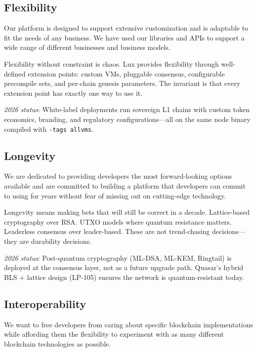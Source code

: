 \documentclass[11pt,a4paper]{article}
\begin{document}
\subsection{Flexibility}

Our platform is designed to support extensive customization and is
adaptable to fit the needs of any business. We have used our libraries
and APIs to support a wide range of different businesses and business
models.

Flexibility without constraint is chaos. Lux provides flexibility
through well-defined extension points: custom VMs, pluggable consensus,
configurable precompile sets, and per-chain genesis parameters. The
invariant is that every extension point has exactly one way to use it.

\medskip\noindent\textit{2026 status}: White-label deployments
run sovereign L1 chains with custom token economics, branding, and
regulatory configurations---all on the same node binary compiled with
\texttt{-tags allvms}.

\subsection{Longevity}

We are dedicated to providing developers the most forward-looking
options available and are committed to building a platform that
developers can commit to using for years without fear of missing out
on cutting-edge technology.

Longevity means making bets that will still be correct in a decade.
Lattice-based cryptography over RSA. UTXO models where quantum
resistance matters. Leaderless consensus over leader-based. These are
not trend-chasing decisions---they are durability decisions.

\medskip\noindent\textit{2026 status}: Post-quantum cryptography
(ML-DSA, ML-KEM, Ringtail) is deployed at the consensus layer, not
as a future upgrade path. Quasar's hybrid BLS + lattice design (LP-105)
ensures the network is quantum-resistant today.

\subsection{Interoperability}

We want to free developers from caring about specific blockchain
implementations while affording them the flexibility to experiment
with as many different blockchain technologies as possible.
\end{document}
